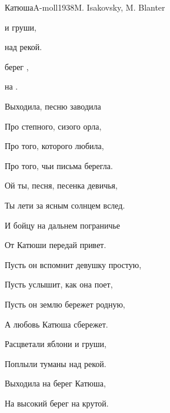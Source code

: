 \begin{song}{Катюша}{A-moll}{1938}{M. Isakovsky, M. Blanter}{}{}
	\begin{SBVerse}
	  и груши,

	  над рекой.

	  берег ,

	   на .
	\end{SBVerse}
	\begin{SBVerse}
	Выходила, песню заводила

	Про степного, сизого орла,

	Про того, которого любила,

	Про того, чьи письма берегла.
	\end{SBVerse}
	\begin{SBVerse}
	Ой ты, песня, песенка девичья,

	Ты лети за ясным солнцем вслед.

	И бойцу на дальнем пограничье

	От Катюши передай привет.
	\end{SBVerse}
	\begin{SBVerse}
	Пусть он вспомнит девушку простую,

	Пусть услышит, как она поет,

	Пусть он землю бережет родную,

	А любовь Катюша сбережет.
	\end{SBVerse}
	\begin{SBVerse}
	Расцветали яблони и груши,

	Поплыли туманы над рекой.

	Выходила на берег Катюша,

	На высокий берег на крутой.
	\end{SBVerse}
\end{song}
